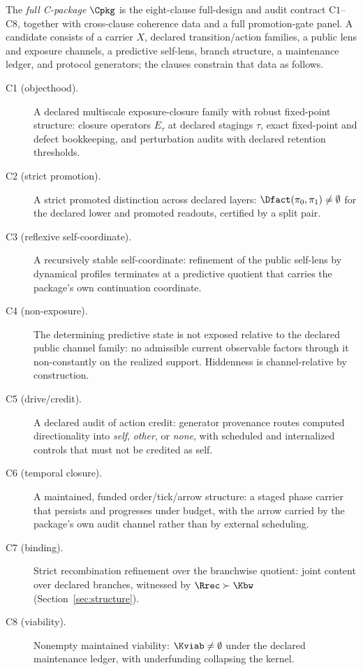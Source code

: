 \begin{definition}
\label{def:cpackage}
The \emph{full C-package} $\Cpkg$ is the eight-clause full-design and audit
contract $\mathrm{C1}$--$\mathrm{C8}$, together with cross-clause coherence
data and a full promotion-gate panel. A candidate consists of a carrier $X$,
declared transition/action families, a public lens and exposure channels, a
predictive self-lens, branch structure, a maintenance ledger, and protocol
generators; the clauses constrain that data as follows.
\begin{description}
\item[C1 (objecthood).] A declared multiscale exposure-closure family with
robust fixed-point structure: closure operators $E_\tau$ at declared stagings
$\tau$, exact fixed-point and defect bookkeeping, and perturbation audits with
declared retention thresholds.
\item[C2 (strict promotion).] A strict promoted distinction across declared
layers: $\Dfact(\pi_0,\pi_1)\neq\emptyset$ for the declared lower and promoted
readouts, certified by a split pair.
\item[C3 (reflexive self-coordinate).] A recursively stable self-coordinate:
refinement of the public self-lens by dynamical profiles terminates at a
predictive quotient that carries the package's own continuation coordinate.
\item[C4 (non-exposure).] The determining predictive state is not exposed
relative to the declared public channel family: no admissible current
observable factors through it non-constantly on the realized support.
Hiddenness is channel-relative by construction.
\item[C5 (drive/credit).] A declared audit of action credit: generator
provenance routes computed directionality into \emph{self}, \emph{other}, or
\emph{none}, with scheduled and internalized controls that must not be
credited as self.
\item[C6 (temporal closure).] A maintained, funded order/tick/arrow structure:
a staged phase carrier that persists and progresses under budget, with the
arrow carried by the package's own audit channel rather than by external
scheduling.
\item[C7 (binding).] Strict recombination refinement over the branchwise
quotient: joint content over declared branches, witnessed by
$\Rrec \succ \Kbw$ (Section~\ref{sec:structure}).
\item[C8 (viability).] Nonempty maintained viability: $\Kviab\neq\emptyset$
under the declared maintenance ledger, with underfunding collapsing the
kernel.
\end{description}
\end{definition}


